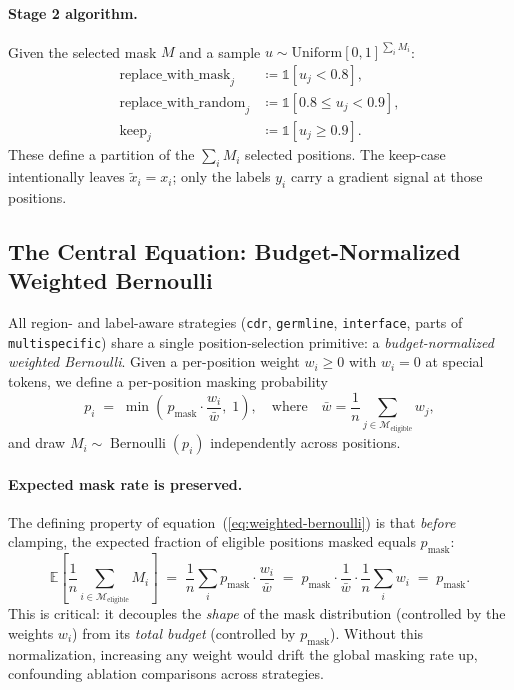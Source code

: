 \documentclass[11pt]{article}
\newcommand{\pmask}{p_{\text{mask}}}
\newcommand{\Ind}{\mathbb{1}}
\newcommand{\E}{\mathbb{E}}
\DeclareMathOperator{\Bern}{Bernoulli}
\begin{document}
\paragraph{Stage 2 algorithm.} Given the selected mask $M$ and a sample
$u \sim \text{Uniform}[0,1]^{\sum_i M_i}$:
\begin{align}
\text{replace\_with\_mask}_j &\coloneqq \Ind[u_j < 0.8], \\
\text{replace\_with\_random}_j &\coloneqq \Ind[0.8 \le u_j < 0.9], \\
\text{keep}_j &\coloneqq \Ind[u_j \ge 0.9].
\end{align}
These define a partition of the $\sum_i M_i$ selected positions. The
keep-case intentionally leaves $\tilde x_i = x_i$; only the labels $y_i$
carry a gradient signal at those positions.

\subsection{The Central Equation: Budget-Normalized Weighted Bernoulli}
\label{sec:weighted-bernoulli}
All region- and label-aware strategies (\texttt{cdr}, \texttt{germline},
\texttt{interface}, parts of \texttt{multispecific}) share a single
position-selection primitive: a \emph{budget-normalized weighted Bernoulli}.
Given a per-position weight $w_i \ge 0$ with $w_i = 0$ at special tokens,
we define a per-position masking probability
\begin{equation}
\boxed{\;
p_i \;=\; \min\!\left(\, \pmask \cdot \frac{w_i}{\bar w}, \; 1 \right),
\quad\text{where}\quad \bar w = \frac{1}{n} \sum_{j \in \mathcal{M}_{\text{eligible}}} w_j,
\;}
\label{eq:weighted-bernoulli}
\end{equation}
and draw $M_i \sim \Bern(p_i)$ independently across positions.

\paragraph{Expected mask rate is preserved.} The defining property of
equation~(\ref{eq:weighted-bernoulli}) is that \emph{before} clamping,
the expected fraction of eligible positions masked equals $\pmask$:
\begin{equation}
\E\!\left[\frac{1}{n} \sum_{i \in \mathcal{M}_{\text{eligible}}} M_i\right]
\;=\; \frac{1}{n}\sum_{i} \pmask \cdot \frac{w_i}{\bar w}
\;=\; \pmask \cdot \frac{1}{\bar w} \cdot \frac{1}{n}\sum_i w_i
\;=\; \pmask.
\label{eq:budget-conservation}
\end{equation}
This is critical: it decouples the \emph{shape} of the mask distribution
(controlled by the weights $w_i$) from its \emph{total budget}
(controlled by $\pmask$). Without this normalization, increasing any
weight would drift the global masking rate up, confounding ablation
comparisons across strategies.
\end{document}
